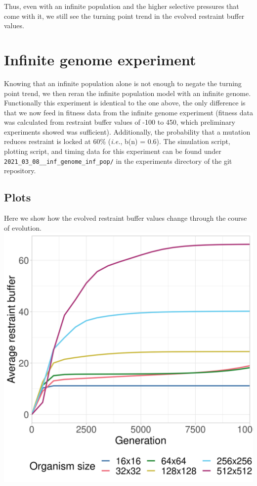 \documentclass[
]{book}
\begin{document}
Thus, even with an infinite population and the higher selective pressures that come with it, we still see the turning point trend in the evolved restraint buffer values.

\hypertarget{infinite-genome-experiment-1}{%
\section{Infinite genome experiment}\label{infinite-genome-experiment-1}}

Knowing that an infinite population alone is not enough to negate the turning point trend, we then reran the infinite population model with an infinite genome.
Functionally this experiment is identical to the one above, the only difference is that we now feed in fitness data from the infinite genome experiment (fitness data was calculated from restraint buffer values of -100 to 450, which preliminary experiments showed was sufficient).
Additionally, the probability that a mutation reduces restraint is locked at 60\% (\emph{i.e.}, b(n) = 0.6).
The simulation script, plotting script, and timing data for this experiment can be found under \texttt{2021\_03\_08\_\_inf\_genome\_inf\_pop/} in the experiments directory of the git repository.

\hypertarget{plots-1}{%
\subsection{Plots}\label{plots-1}}

Here we show how the evolved restraint buffer values change through the course of evolution.
\includegraphics{./inf_pop/inf_over_time.png}
\end{document}

